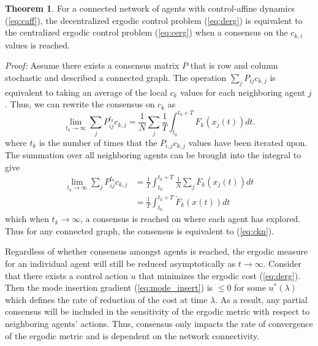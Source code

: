 \documentclass[letterpaper, 10 pt,  conference, twoside]{IEEEtran/IEEEtran}
\theoremstyle{definition}
\newtheorem{theorem}{Theorem}
\begin{document}
\begin{theorem}
For a connected network of agents with control-affine dynamics (\ref{eq:caff}), the decentralized ergodic control problem (\ref{eq:derg}) is equivalent to the centralized ergodic control problem (\ref{eq:cerg}) when a consensus on the $c_{k,i}$ values is reached.
\end{theorem}
{\it Proof: } Assume there exists a consensus matrix $P$ that is row and column stochastic and described a connected graph. The operation $ \sum_j P_{ij} c_{k,j}$ is equivalent to taking an average of the local $c_k$ values for each neighboring agent $j$. Thus, we can rewrite the consensus on $c_k$ as
\begin{equation}
\lim_{t_k \to \infty}\sum_j P_{ij}^{t_k} c_{k,j} = \frac{1}{N}\sum_j \frac{1}{T} \int_{t_0}^{t_0 +T} F_k(x_j(t)) dt.
\end{equation}
where $t_k$ is the number of times that the $P_{i,j} c_{k,j}$ values have been iterated upon. The summation over all neighboring agents can be brought into the integral to give
\begin{equation}
\begin{aligned}
\lim_{t_k \to \infty}\sum_j P_{ij}^{t_k} c_{k,j} &=  \frac{1}{T} \int_{t_0}^{t_0 +T} \frac{1}{N}\sum_j F_k(x_j(t)) dt \\
&= \frac{1}{T} \int_{t_0}^{t_0 +T} \tilde{F}_k(x(t)) dt
\end{aligned}
\end{equation}
which when $t_k \to \infty$, a consensus is reached on where each agent has explored. Thus for any connected graph, the consensus is equivalent to (\ref{eq:ckn}).

Regardless of whether consensus amongst agents is reached, the ergodic measure for an individual agent will still be reduced asymptotically as $t \to \infty$. Consider that there exists a control action $u$ that minimizes the ergodic cost (\ref{eq:derg}). Then the mode insertion gradient (\ref{eq:mode_insert}) is $\le 0$ for some $u^*(\lambda)$ which defines the rate of reduction of the cost at time $\lambda$. As a result, any partial consensus will be included in the sensitivity of the ergodic metric with respect to neighboring agents' actions. Thus, consensus only impacts the rate of convergence of the ergodic metric and is dependent on the network connectivity.
\end{document}
